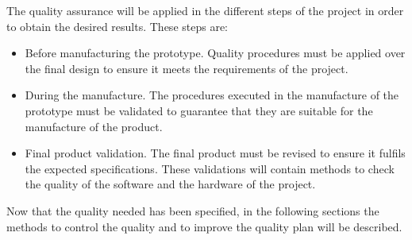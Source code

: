 The quality assurance will be applied in the different steps of the project in order to obtain the desired results. These steps are:
\begin{itemize}
\item  Before manufacturing the prototype. Quality procedures must be applied over the final design to ensure it meets the requirements of the project.
\item During the manufacture. The procedures executed in the manufacture of the prototype must be validated to guarantee that they are suitable for the manufacture of the product.
\item Final product validation. The final product must be revised to ensure it fulfils the expected specifications. These validations will contain methods to check the quality of the software and the hardware of the project.
\end{itemize} 
Now that the quality needed has been specified, in the following sections the methods to control the quality and to improve the quality plan will be described. 
